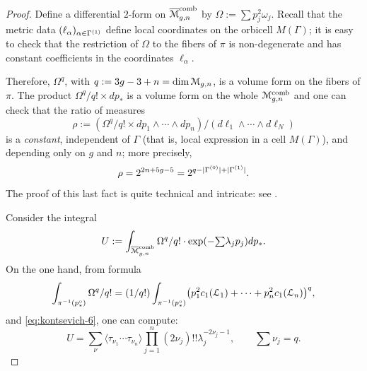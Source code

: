 \begin{proof}
  Define a differential $2$-form on $\overline{\mathcal{M}}\sp{\text{comb}}_{g,n}$ by $\Omega := \sum
  p_j^2 \omega_j$. Recall that the metric data $(\ell_\alpha)_{\alpha \in \Gamma^{(1)}}$
  define local coordinates on the orbicell $M(\Gamma)$; it is easy to check
  that the restriction of $\Omega$ to the fibers of $\pi$ is non-degenerate
  and has constant coefficients in the coordinates $\ell_\alpha$. 

  Therefore, $\Omega^q$, with $q := 3g -3 + n = \dim \mathcal{M}_{g,n}$, is a
  volume form on the fibers of $\pi$.  The product $\Omega^q/q! \times
  dp_*$ is a volume form on the whole $\mathcal{M}\sp{\text{comb}}_{g,n}$ and one can check
  that the ratio of measures
  \begin{equation*}
    \rho := (\Omega^q/q! \times {dp_1 \land \cdots \land dp_n}) / (d\ell_1 \land \cdots \land d\ell_N) 
  \end{equation*}
  is a \emph{constant}, independent of $\Gamma$ (that is, local expression
  in a cell $M(\Gamma)$), and depending only on $g$ and $n$; more precisely,
  \begin{equation*}
    \rho = 2^{2n + 5g - 5} = 2^{q - \lvert\Gamma^{(0)}\rvert + \lvert\Gamma^{(1)}\rvert}.
  \end{equation*}
  The proof of this last fact is quite technical and intricate: see
  \cite[Appendix C]{kontsevich;intersection-theory;1992}.

  Consider the integral
  \begin{equation*}
    U := \int_{\overline{\mathcal{M}}\sp{\text{comb}}_{g,n}} \Omega^q/q! \cdot \exp(-{\textstyle\sum} \lambda_j p_j) dp_*.
  \end{equation*}
  On the one hand, from formula
  \begin{equation*}
    \int_{\pi^{-1}(p^\circ_*)} \Omega^q/q! = (1/q!) \int_{\pi^{-1}(p^\circ_*)} \bigl( p_1^2
    c_1({\mathcal{L}}_1) + \cdots + p_n^2 c_1({\mathcal{L}}_n) \bigr)^q,
  \end{equation*}
  and \eqref{eq:kontsevich-6}, one can compute:
  \begin{equation}
    \label{eq:8}
    U = \sum_\nu \langle \tau_{\nu_1} \cdots \tau_{\nu_n} \rangle \prod_{j=1}^n (2\nu_j)!!
    \lambda_j^{-2\nu_j -1}, \qquad \sum \nu_j = q.
  \end{equation}


\end{proof}
